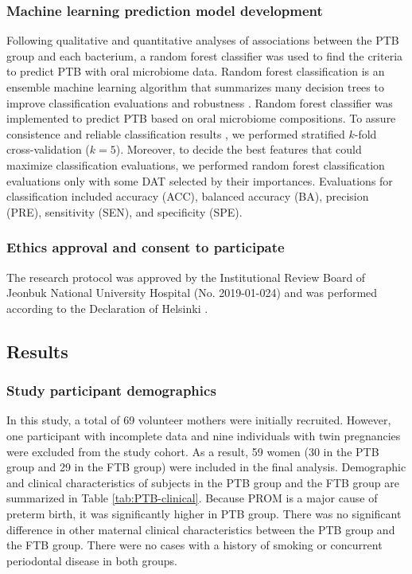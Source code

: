 \documentclass[11pt, a4paper, onecolumn, oneside]{report}
\begin{document}
            \subsubsection{Machine learning prediction model development}
                Following qualitative and quantitative analyses of associations between the PTB group and each bacterium, a random forest classifier was used to find the criteria to predict PTB with oral microbiome data. Random forest classification is an ensemble machine learning algorithm that summarizes many decision trees to improve classification evaluations and robustness \cite{RF-1}. Random forest classifier was implemented to predict PTB based on oral microbiome compositions. To assure consistence and reliable classification results \cite{Kfold-1}, we performed stratified $k$-fold cross-validation ($k=5$). Moreover, to decide the best features that could maximize classification evaluations, we performed random forest classification evaluations only with some DAT selected by their importances. Evaluations for classification included accuracy (ACC), balanced accuracy (BA), precision (PRE), sensitivity (SEN), and specificity (SPE).

            \subsubsection{Ethics approval and consent to participate}
                The research protocol was approved by the Institutional Review Board of Jeonbuk National University Hospital (No. 2019-01-024) and was performed according to the Declaration of Helsinki \cite{Helsinki-1}.
        \newpage

        \subsection{Results}
            \subsubsection{Study participant demographics}
                In this study, a total of 69 volunteer mothers were initially recruited. However, one participant with incomplete data and nine individuals with twin pregnancies were excluded from the study cohort. As a result, 59 women (30 in the PTB group and 29 in the FTB group) were included in the final analysis. Demographic and clinical characteristics of subjects in the PTB group and the FTB group are summarized in Table \ref{tab:PTB-clinical}. Because PROM is a major cause of preterm birth, it was significantly higher in PTB group. There was no significant difference in other maternal clinical characteristics between the PTB group and the FTB group. There were no cases with a history of smoking or concurrent periodontal disease in both groups.
\end{document}
